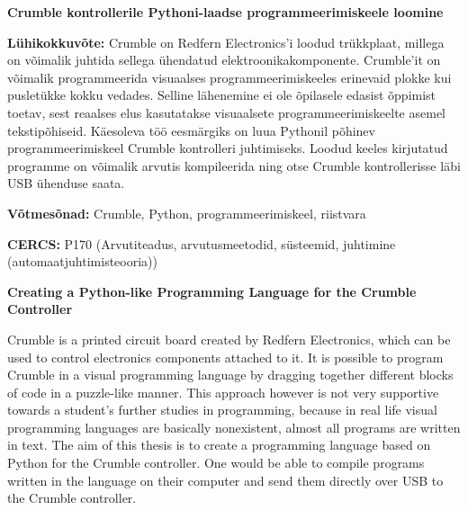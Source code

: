 \documentclass[12pt]{article}
\begin{document}


\newpage

\noindent\textbf{\large Crumble kontrollerile Pythoni-laadse programmeerimiskeele loomine}
\vspace*{3ex}

\noindent\textbf{Lühikokkuvõte:} 
Crumble on Redfern Electronics'i loodud trükkplaat, millega on võimalik juhtida sellega ühendatud elektroonikakomponente. Crumble'it on võimalik programmeerida visuaalses programmeerimiskeeles erinevaid plokke kui pusletükke kokku vedades. Selline lähenemine ei ole õpilasele edasist õppimist toetav, sest reaalses elus kasutatakse visuaalsete programmeerimiskeelte asemel tekstipõhiseid. Käesoleva töö eesmärgiks on luua Pythonil põhinev programmeerimiskeel Crumble kontrolleri juhtimiseks. Loodud keeles kirjutatud programme on võimalik arvutis kompileerida ning otse Crumble kontrollerisse läbi USB ühenduse saata.
\vspace*{3ex}

\noindent\textbf{Võtmesõnad:} Crumble, Python, programmeerimiskeel, riistvara
\vspace*{3ex}

\noindent\textbf{CERCS:} P170 (Arvutiteadus, arvutusmeetodid, süsteemid, juhtimine (automaatjuhtimisteooria))
\vspace*{6ex}

\noindent\textbf{\large Creating a Python-like Programming Language for the Crumble Controller}
\vspace*{3ex}
{ }

Crumble is a printed circuit board created by Redfern Electronics, which can be used to control electronics components attached to it. It is possible to program Crumble in a visual programming language by dragging together different blocks of code in a puzzle-like manner. This approach however is not very supportive towards a student's further studies in programming, because in real life visual programming languages are basically nonexistent, almost all programs are written in text. The aim of this thesis is to create a programming language based on Python for the Crumble controller. One would be able to compile programs written in the language on their computer and send them directly over USB to the Crumble controller.
\end{document}
